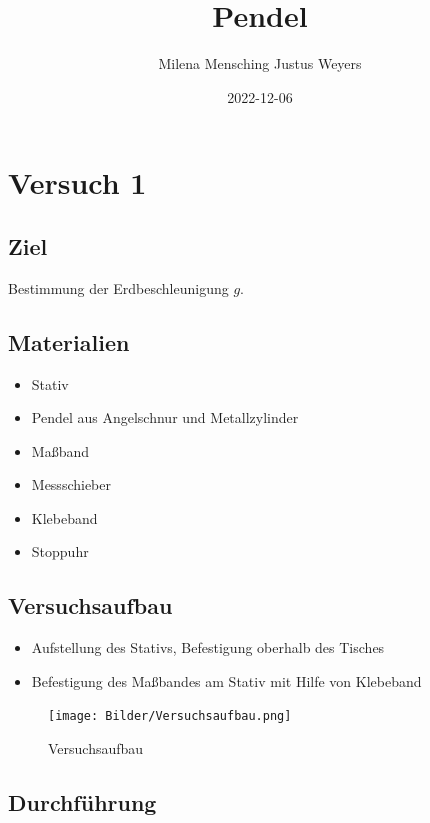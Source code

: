 \documentclass[
  9pt,
]{article}
\title{Pendel}
\author{Milena Mensching Justus Weyers}
\date{2022-12-06}
\providecommand{\tightlist}{%
  \setlength{\itemsep}{0pt}\setlength{\parskip}{0pt}}
\begin{document}
\maketitle

\hypertarget{versuch-1}{%
\section{Versuch 1}\label{versuch-1}}

\hypertarget{ziel}{%
\subsection{Ziel}\label{ziel}}

Bestimmung der Erdbeschleunigung \(g\).

\hypertarget{materialien}{%
\subsection{Materialien}\label{materialien}}

\begin{itemize}
\tightlist
\item
  Stativ
\item
  Pendel aus Angelschnur und Metallzylinder
\item
  Maßband
\item
  Messschieber
\item
  Klebeband
\item
  Stoppuhr
\end{itemize}

\hypertarget{versuchsaufbau}{%
\subsection{Versuchsaufbau}\label{versuchsaufbau}}

\begin{itemize}
\tightlist
\item
  Aufstellung des Stativs, Befestigung oberhalb des Tisches
\item
  Befestigung des Maßbandes am Stativ mit Hilfe von Klebeband
\end{itemize}

\begin{figure}
\centering
\texttt{[image: Bilder/Versuchsaufbau.png]}
\caption{Versuchsaufbau}
\end{figure}

\hypertarget{durchfuxfchrung}{%
\subsection{Durchführung}\label{durchfuxfchrung}}
\end{document}
